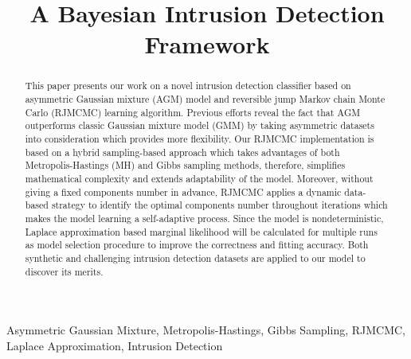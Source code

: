 \documentclass[conference]{IEEEtran}
\begin{document}
\title{A Bayesian Intrusion Detection Framework\\
}

\author{
\and
{}
}

\maketitle

\begin{abstract}
This paper presents our work on a novel intrusion detection classifier based on asymmetric Gaussian mixture (AGM) model and reversible jump Markov chain Monte Carlo (RJMCMC) learning algorithm. Previous efforts reveal the fact that AGM outperforms classic Gaussian mixture model (GMM) by taking asymmetric datasets into consideration which provides more flexibility. Our RJMCMC implementation is based on a hybrid sampling-based approach which takes advantages of both Metropolis-Hastings (MH) and Gibbs sampling methods, therefore, simplifies mathematical complexity and extends adaptability of the model. Moreover, without giving a fixed components number in advance, RJMCMC applies a dynamic data-based strategy to identify the optimal components number throughout iterations which makes the model learning a self-adaptive process. Since the model is nondeterministic, Laplace approximation based marginal likelihood will be calculated for multiple runs as model selection procedure to improve the correctness and fitting accuracy. Both synthetic and challenging intrusion detection datasets are applied to our model to discover its merits.
\end{abstract}

\begin{IEEEkeywords}
Asymmetric Gaussian Mixture, Metropolis-Hastings, Gibbs Sampling, RJMCMC, Laplace Approximation, Intrusion Detection
\end{IEEEkeywords}
\end{document}

